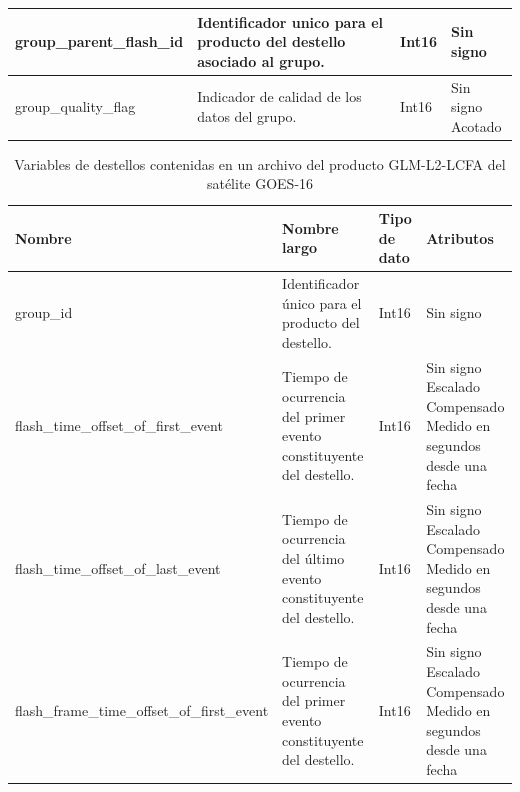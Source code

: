 \begin{table}[H]
\begin{tabular}{l|p{3cm}|p{1.15cm}|p{3.5cm}}
    group\_parent\_flash\_id &
    Identificador unico para el producto del destello asociado al grupo.&
    Int16 &
    \parbox[t]{3.5cm}{Sin signo}\\ \hline

    group\_quality\_flag &
    Indicador de calidad de los datos del grupo.&
    Int16 &
    \parbox[t]{3.5cm}{Sin signo \\ Acotado}\\ 

  \end{tabular}
\end{table}

\begin{table}[H]
  \centering
  \small
  \caption{
    Variables de destellos contenidas en un archivo del producto GLM-L2-LCFA del
    satélite GOES-16
  }
  \label{tab:vars_flash_glm}
  \begin{tabular}{l|p{3cm}|p{1.15cm}|p{3.5cm}}
    \textbf{Nombre} & 
    \textbf{Nombre largo} & 
    \textbf{Tipo de dato} & 
    \textbf{Atributos} \\ \hline

    group\_id &
    Identificador único para el producto del destello.&
    Int16 &
    \parbox[t]{3.5cm}{Sin signo}\\ \hline

    flash\_time\_offset\_of\_first\_event &
    Tiempo de ocurrencia del primer evento constituyente del destello. &
    Int16 &
    \parbox[t]{3.5cm}{Sin signo \\ Escalado \\ Compensado \\ Medido en segundos desde una fecha}\\ \hline

    flash\_time\_offset\_of\_last\_event &
    Tiempo de ocurrencia del último evento constituyente del destello. &
    Int16 &
    \parbox[t]{3.5cm}{Sin signo \\ Escalado \\ Compensado \\ Medido en segundos desde una fecha}\\ \hline

    flash\_frame\_time\_offset\_of\_first\_event &
    Tiempo de ocurrencia del primer evento constituyente del destello. &
    Int16 &
    \parbox[t]{3.5cm}{Sin signo \\ Escalado \\ Compensado \\ Medido en segundos desde una fecha}\\ \hline


\end{tabular}
\end{table}
